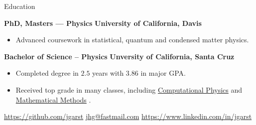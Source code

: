 \documentclass[11pt,a4paper]{article}
\newcommand{\ComputationalPhysics}{
  \href{http://young.physics.ucsc.edu/115/}{Computational Physics}
}
\newcommand{\MathematicalMethods}{
  \href{http://scipp.ucsc.edu/~haber/ph116C/}{Mathematical Methods}
}
\begin{document}
\begin{mysection}{Education}

  \begin{addmargin}[0.5em]{0em}
    {\large\bfseries PhD, Masters --- Physics}
    \hfill {\bfseries University of California, Davis}
    \begin{adjustwidth}{1ex}{0ex}

    \begin{itemize}
        [label=-, topsep=0pt, itemsep=0.5ex, parsep=0pt, leftmargin=1em]
      \item Advanced coursework in statistical, quantum and condensed matter
            physics.
    \end{itemize}
    \end{adjustwidth}
  \end{addmargin}

  \medskip

  \begin{addmargin}[0.5em]{0em}
    {\large\bfseries Bachelor of Science -- Physics}
    \hfill {\bfseries Unversity of California, Santa Cruz}
    \begin{adjustwidth}{1ex}{0ex}

    \begin{itemize}
      [label=-, topsep=0pt, itemsep=0.5ex, parsep=0pt, leftmargin=1em]
      \item Completed degree in $2.5$ years with $3.86$ in major GPA.
      \item Received top grade in many classes, including \ComputationalPhysics{}
            and \MathematicalMethods{}.
    \end{itemize}

    \end{adjustwidth}
  \end{addmargin}

\end{mysection}

\vfill

\begin{center}
  \href{https://github.com/jgarst}{https://github.com/jgarst}
  \textbullet{}
  \href{mailto:jhg@fastmail.com}{jhg@fastmail.com}
  \textbullet{}
  \href{https://www.linkedin.com/in/jgarst}
       {https://www.linkedin.com/in/jgarst}
\end{center}
\end{document}
